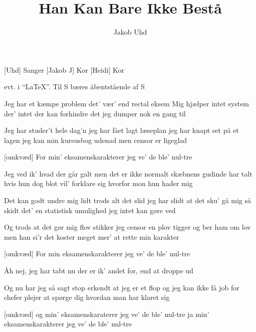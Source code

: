 \documentclass[a4paper]{article}
\title{Han Kan Bare Ikke Bestå}
\author{Jakob Uhd}
\begin{document}
\maketitle

\begin{roles}
  [Uhd] Sanger
  [Jakob J] Kor
  [Heidi] Kor
\end{roles}

\begin{props}
   evt. i ``\LaTeX''. Til S
   bæres åbentstående af S
\end{props}
\begin{song}

Jeg har et kæmpe problem
det' vær' end rectal eksem
Mig hjælper intet system
der' intet der kan forhindre det
jeg dumper nok en gang til

Jeg har studer't hele dag'n
jeg har fået lagt læseplan
jeg har knapt set på et lagen
jeg kan min kursusbog udenad
men censor er ligeglad

[omkvæd]
For min' eksamenskarakterer
jeg ve'
de ble'
nul-tre

Jeg ved ik' hvad der går galt
men det er ikke normalt
skæbnens gudinde har talt
hvis hun dog blot vil' forklare sig
hvorfor mon hun hader mig

Det kan godt undre mig lidt
trods alt det slid jeg har slidt
at det sku' gå mig så skidt
det' en statistisk umulighed
jeg intet kan gøre ved

Og trods at det gør mig flov
stikker jeg censor en plov
tigger og ber ham om lov
men han si'r det koster meget mer'
at rette min karakter


[omkvæd]
For min eksamenskarakterer
jeg ve'
de ble'
nul-tre

Åh nej, jeg har tabt nu
der er ik' andet for, end at droppe ud

Og nu har jeg så sagt stop
erkendt at jeg er et flop
og jeg kan ikke få job
for chefer plejer at spørge dig
hvordan man har klaret sig

[omkvæd]
og min' eksamenskaraterer
jeg ve'
de ble'
nul-tre
ja min' eksamenskarakterer
jeg ve'
de ble'
nul-tre

\end{song}
\end{document}
